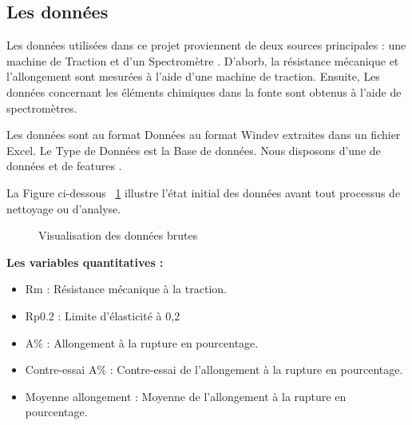 \documentclass[12pt]{article}
\begin{document}
\subsection{Les données}


Les données utilisées dans ce projet proviennent de deux sources principales :
une machine de Traction et d'un Spectromètre . 
D'aborb, la résistance mécanique et l'allongement sont mesurées à l'aide d'une 
machine de traction. Ensuite, Les données concernant les éléments chimiques dans 
la fonte sont obtenus à l'aide de spectromètres.



Les données sont au format Données au format Windev extraites dans un fichier Excel.
Le Type de Données est la Base de données. Nous disposons d'une de données et de features .

La Figure ci-dessous ~\ref{fig:donnees_brutes}  illustre l'état initial des données avant tout 
processus de nettoyage ou d'analyse.



\begin{figure}[H]
    \centering
    \caption{Visualisation des données brutes}
    \label{fig:donnees_brutes}
\end{figure}




    
    


\textbf{Les variables quantitatives :}

\begin{itemize}
\item Rm : Résistance mécanique à la traction.
\item Rp0.2 : Limite d'élasticité à 0,2%
\item A\% : Allongement à la rupture en pourcentage.
\item Contre-essai A\% : Contre-essai de l'allongement à la rupture en pourcentage.
\item Moyenne allongement : Moyenne de l'allongement à la rupture en pourcentage.
\end{itemize}
    
\end{document}
